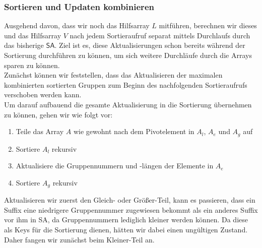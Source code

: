 \subsubsection{Sortieren und Updaten kombinieren}
Ausgehend davon, dass wir noch das Hilfsarray $L$ mitführen, berechnen wir dieses und das Hilfsarray $V$ nach jedem Sortieraufruf separat mittels Durchlaufs durch das bisherige $\mathsf{SA}$. Ziel ist es, diese Aktualisierungen schon bereits während der Sortierung durchführen zu können, um sich weitere Durchläufe durch die Arrays sparen zu können. \\
Zunächst können wir feststellen, dass das Aktualisieren der maximalen kombinierten sortierten Gruppen zum Beginn des nachfolgenden Sortieraufrufs verschoben werden kann.  \\
Um darauf aufbauend die gesamte Aktualisierung in die Sortierung übernehmen zu können, gehen wir wie folgt vor:
\begin{enumerate}
\item Teile das Array $A$ wie gewohnt nach dem Pivotelement in $A_l$, $A_e$ und $A_g$ auf
\item Sortiere $A_l$ rekursiv
\item Aktualisiere die Gruppennummern und -längen der Elemente in $A_e$
\item Sortiere $A_g$ rekursiv
\end{enumerate}

Aktualisieren wir zuerst den \glqq Gleich\grqq{}- oder \glqq Größer\grqq{}-Teil, kann es passieren, dass 
ein Suffix eine niedrigere Gruppennummer zugewiesen bekommt als ein anderes Suffix vor ihm in SA, da 
Gruppennummern lediglich kleiner werden können. Da diese als Keys für die Sortierung dienen, hätten wir dabei einen ungültigen Zustand. Daher fangen wir zunächst beim \glqq Kleiner\grqq{}-Teil an. \\

